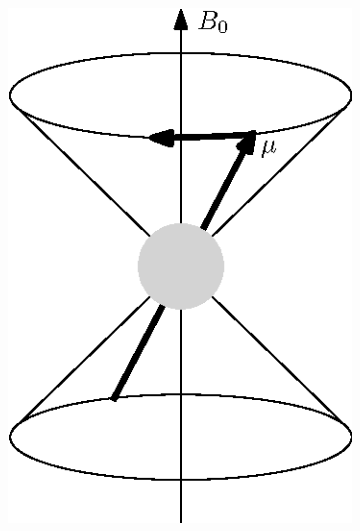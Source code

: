 \begin{figure}
	\centering
	\begin{subfigure}{0.3\textwidth}
		\includegraphics[width = \textwidth]{figures/background/precession.eps}
		\caption{}
		\label{fig:precession}
	\end{subfigure}
	\hspace{2cm}
	\begin{subfigure}{0.3\textwidth}

\end{subfigure}
\end{figure}
